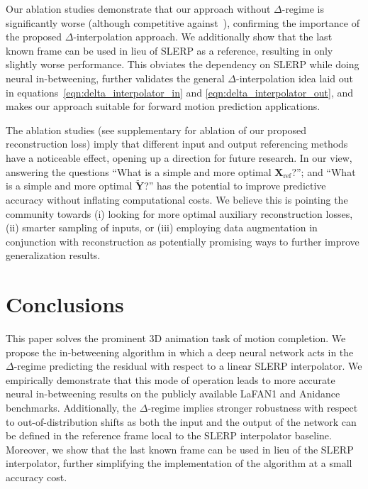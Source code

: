 \documentclass[letterpaper]{article} \usepackage[]{aaai23}  \usepackage{times}  \usepackage{helvet}  \usepackage{courier}  \usepackage[hyphens]{url}  \usepackage{graphicx} \urlstyle{rm} \def\UrlFont{\rm}  \usepackage{natbib}  \usepackage{caption} \frenchspacing  \setlength{\pdfpagewidth}{8.5in} \setlength{\pdfpageheight}{11in}
\renewcommand{\vec}[1]{\mathbf{#1}}
\begin{document}
Our ablation studies demonstrate that our approach without $\Delta$-regime is significantly worse (although competitive against~\cite{duan2021singleshot}), confirming the importance of the proposed $\Delta$-interpolation approach. We additionally show that the last known frame can be used in lieu of SLERP as a reference, resulting in only slightly worse performance. This obviates the dependency on SLERP while doing neural in-betweening, further validates the general $\Delta$-interpolation idea laid out in equations~\eqref{eqn:delta_interpolator_in} and \eqref{eqn:delta_interpolator_out}, and makes our approach suitable for forward motion prediction applications. 

The ablation studies (see supplementary for ablation of our proposed reconstruction loss) imply that different input and output referencing methods have a noticeable effect, opening up a direction for future research. In our view, answering the questions ``What is a simple and more optimal $\vec{X}_{\textrm{ref}}$?''; and ``What is a simple and more optimal $\widetilde{\vec{Y}}$?'' has the potential to improve predictive accuracy without inflating computational costs. 
We believe this is pointing the community towards (i) looking for more optimal auxiliary reconstruction losses, (ii)  smarter sampling of inputs, or (iii) employing data augmentation in conjunction with reconstruction as potentially promising ways to further improve generalization results.

\section{Conclusions} \label{sec:conclusions}
This paper solves the prominent 3D animation task of motion completion. We propose the in-betweening algorithm in which a deep neural network acts in the $\Delta$-regime predicting the residual with respect to a linear SLERP interpolator. We empirically demonstrate that this mode of operation leads to more accurate neural in-betweening results on the publicly available LaFAN1 and Anidance benchmarks. Additionally, the $\Delta$-regime implies stronger robustness with respect to out-of-distribution shifts as both the input and the output of the network can be defined in the reference frame local to the SLERP interpolator baseline. Moreover, we show that the last known frame can be used in lieu of the SLERP interpolator, further simplifying the implementation of the algorithm at a small accuracy cost. 
\end{document}
